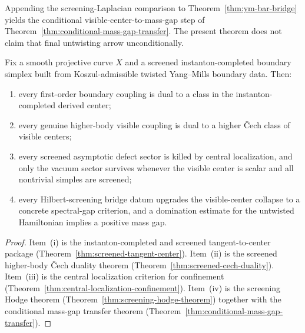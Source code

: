 \begin{remark}
\label{rem:ym-bar-bridge-conditional-gap}
Appending the screening-Laplacian comparison to
Theorem~\ref{thm:ym-bar-bridge} yields the conditional
visible-center-to-mass-gap step of
Theorem~\ref{thm:conditional-mass-gap-transfer}. The present theorem
does not claim that final untwisting arrow unconditionally.
\end{remark}

\begin{theorem}
\label{thm:grand-synthesis-principle}
Fix a smooth projective curve $X$ and a screened instanton-completed boundary simplex built from
Koszul-admissible twisted Yang--Mills boundary data.
Then:
\begin{enumerate}[label=(\roman*)]
\item every first-order boundary coupling is dual to a class in the instanton-completed derived center;
\item every genuine higher-body visible coupling is dual to a higher \v{C}ech class of visible centers;
\item every screened asymptotic defect sector is killed by central localization, and only the vacuum sector
survives whenever the visible center is scalar and all nontrivial simples are screened;
\item every Hilbert-screening bridge datum upgrades the visible-center collapse to a concrete spectral-gap criterion,
and a domination estimate for the untwisted Hamiltonian implies a positive mass gap.
\end{enumerate}
\end{theorem}

\begin{proof}
Item~(i) is the instanton-completed and screened tangent-to-center package
(Theorem~\ref{thm:screened-tangent-center}).
Item~(ii) is the screened higher-body \v{C}ech duality theorem
(Theorem~\ref{thm:screened-cech-duality}).
Item~(iii) is the central localization criterion for confinement
(Theorem~\ref{thm:central-localization-confinement}).
Item~(iv) is the screening Hodge theorem
(Theorem~\ref{thm:screening-hodge-theorem}) together with
the conditional mass-gap transfer theorem
(Theorem~\ref{thm:conditional-mass-gap-transfer}).
\end{proof}

